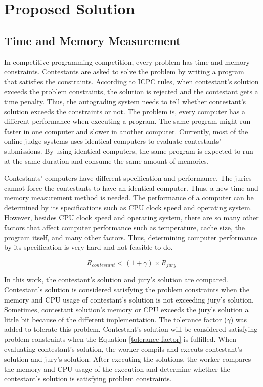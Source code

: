 \documentclass[conference,a4paper]{IEEEtran}
\begin{document}
\section{Proposed Solution}

\subsection{Time and Memory Measurement}

In competitive programming competition, every problem has time and memory constraints. Contestants are asked to solve the problem by writing a program that satisfies the constraints. According to ICPC rules, when contestant's solution exceeds the problem constraints, the solution is rejected and the contestant gets a time penalty. Thus, the autograding system needs to tell whether contestant's solution exceeds the constraints or not. The problem is, every computer has a different performance when executing a program. The same program might run faster in one computer and slower in another computer. Currently, most of the online judge systems uses identical computers to evaluate contestants' submissions. By using identical computers, the same program is expected to run at the same duration and consume the same amount of memories.

Contestants' computers have different specification and performance. The juries cannot force the contestants to have an identical computer. Thus, a new time and memory measurement method is needed. The performance of a computer can be determined by its specifications such as CPU clock speed and operating system. However, besides CPU clock speed and operating system, there are so many other factors that affect computer performance such as temperature, cache size, the program itself, and many other factors. Thus, determining computer performance by its specification is very hard and not feasible to do.

\begin{equation}\label{tolerance-factor}
R_{contestant} < (1 + \gamma) \times R_{jury}
\end{equation}

In this work, the contestant's solution and jury's solution are compared. Contestant's solution is considered satisfying the problem constraints when the memory and CPU usage of contestant's solution is not exceeding jury's solution. Sometimes, contestant solution's memory or CPU exceeds the jury's solution a little bit because of the different implementation. The tolerance factor ($\gamma$) was added to tolerate this problem. Contestant's solution will be considered satisfying problem constraints when the Equation \ref{tolerance-factor} is fulfilled. When evaluating contestant's solution, the worker compils and executs contestant's solution and jury's solution. After executing the solutions, the worker compares the memory and CPU usage of the execution and determine whether the contestant's solution is satisfying problem constraints. 
\end{document}
